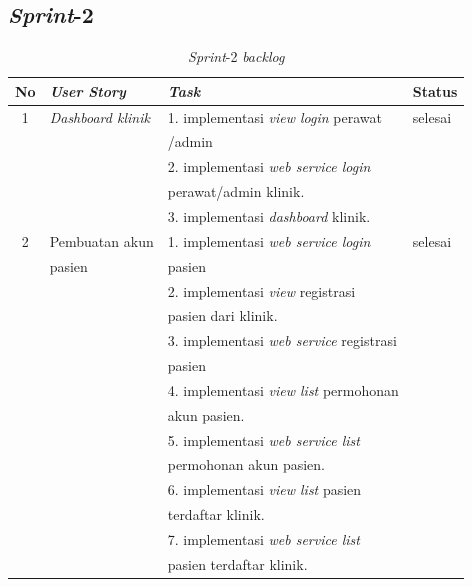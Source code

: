 \subsection{\emph{Sprint}-2}
\begin{table}[H]
	\centering
	\caption{\emph{Sprint}-2 \emph{backlog}}
	\label{tabel_input}
	\begin{tabular}{|c|l|l|l|}
		\hline
		\textbf{No} & \textbf{\emph{User Story}} & \textbf{\emph{Task}} & \textbf{Status} \\
		\hline
		
		1 & 
		\emph{Dashboard klinik} & 
		1. implementasi \emph{view login} perawat &
		selesai\\
		
		& 
		& 
		/admin &
		\\
		
		& 
		& 
		2. implementasi \emph{web service login} &
		\\
		
		& 
		& 
		perawat/admin klinik.&
		\\
		
		& 
		& 
		3. implementasi \emph{dashboard} klinik.&
		\\
		\hline
		
		2 & 
		Pembuatan akun & 
		1. implementasi \emph{web service login} &
		selesai\\
		
		& 
		pasien& 
		pasien&
		\\
		
		& 
		& 
		2. implementasi \emph{view} registrasi
		&
		\\
		
		& 
		& 
		pasien dari klinik.&
		\\
		
		
		& 
		& 
		3. implementasi \emph{web service} registrasi &
		\\
		
		& 
		& 
		pasien &
		\\
		
		
		& 
		& 
		4. implementasi \emph{view list} permohonan &
		\\
		
		& 
		& 
		akun pasien.&
		\\
		
		& 
		& 
		5. implementasi \emph{web service list}&
		\\
		 
		& 
		& 
		permohonan akun pasien.&
		\\
		
		& 
		& 
		6. implementasi \emph{view list} pasien&
		\\
		
		& 
		& 
		terdaftar klinik.&
		\\
		
		& 
		& 
		7. implementasi \emph{web service list} &
		\\
		
		& 
		& 
		pasien terdaftar klinik.&\\
		\hline
		
	\end{tabular}
\end{table}

